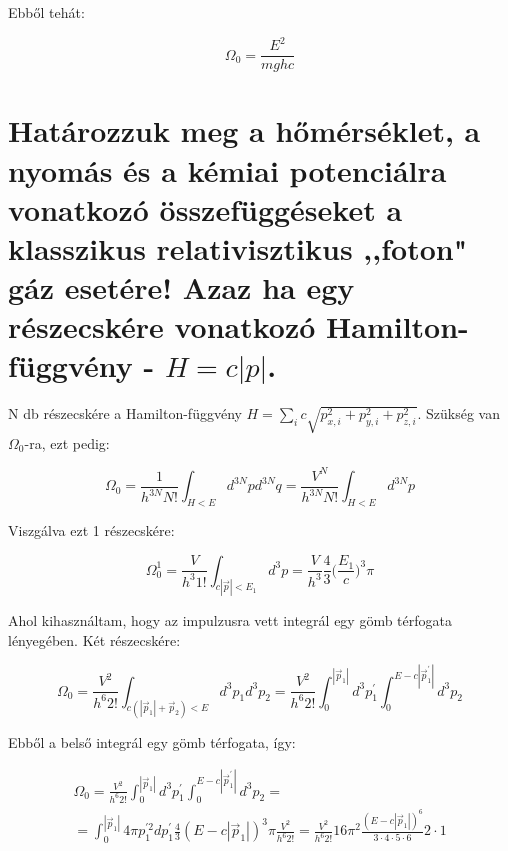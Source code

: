 \documentclass[a4paper,12pt]{article}
\begin{document}
\par Ebből tehát:

\begin{equation}
\Omega_{0} = \frac{E^{2}}{mghc}
\end{equation}

\section{Határozzuk meg a hőmérséklet, a nyomás és a kémiai potenciálra vonatkozó összefüggéseket a klasszikus relativisztikus ,,foton" gáz esetére! Azaz ha egy részecskére vonatkozó Hamilton-függvény - $H = c|p|$.}

\par N db részecskére a Hamilton-függvény $H = \sum_{i}c\sqrt{p_{x,i}^{2} + p_{y,i}^{2} + p_{z, i}^{2}}$. Szükség van $\Omega_{0}$-ra, ezt pedig:

\begin{equation*}
\Omega_{0} = \frac{1}{h^{3N}N!}\int_{H < E} d^{3N}p d^{3N}q = \frac{V^{N}}{h^{3N}N!}\int_{H < E} d^{3N}p 
\end{equation*}

\par Viszgálva ezt 1 részecskére:

\begin{equation*}
\Omega_{0}^{1} = \frac{V}{h^{3}1!}\int_{c|\vec{p}| < E_{1}} d^{3}p = \frac{V}{h^{3}}\frac{4}{3}\Big(\frac{E_{1}}{c}\Big)^{3}\pi
\end{equation*}

\par Ahol kihasználtam, hogy az impulzusra vett integrál egy gömb térfogata lényegében. Két részecskére:

\begin{equation*}
\Omega_{0} = \frac{V^{2}}{h^{6}2!}\int_{c(|\vec{p}_{1}| + \vec{p}_{2}) < E} d^{3}p_{1}d^{3}p_{2} = \frac{V^{2}}{h^{6}2!} \int_{0}^{ |\vec{p}_{1}| }d^{3}p_{1}^{'}\int_{0}^{E - c|\vec{p}_{1}^{'}|}d^{3}p_{2}
\end{equation*}

\par Ebből a belső integrál egy gömb térfogata, így:

\begin{equation*}
\begin{gathered}
\Omega_{0} = \frac{V^{2}}{h^{6}2!} \int_{0}^{ |\vec{p}_{1}| }d^{3}p_{1}^{'}\int_{0}^{E - c|\vec{p}_{1}^{'}|}d^{3}p_{2} = \\
= \int_{0}^{|\vec{p}_{1}|}4\pi p_{1}^{'2}dp_{1}^{'}\frac{4}{3}(E - c|\vec{p}_{1}|)^{3}\pi \frac{V^{2}}{h^{6}2!} = \frac{V^{2}}{h^{6}2!} 16\pi^{2} \frac{(E - c|\vec{p}_{1}|)^{6}}{3\cdot4\cdot5\cdot6}2\cdot1
\end{gathered}
\end{equation*}
\end{document}
